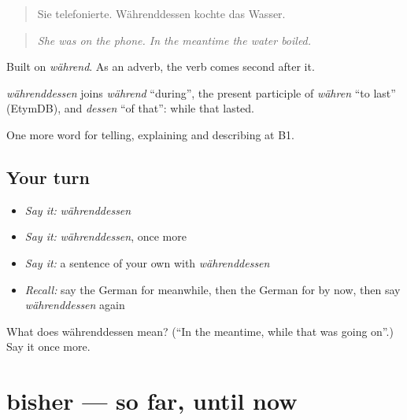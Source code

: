 \begin{quote}
Sie telefonierte. Währenddessen kochte das Wasser.
\end{quote}

\begin{quote}
\emph{She was on the phone. In the meantime the water boiled.}
\end{quote}

Built on \emph{während}. As an adverb, the verb comes second after it.

\begin{cousinweb}
\emph{währenddessen} joins \emph{während} \textquotedblleft{}during\textquotedblright{}, the present participle of \emph{währen} \textquotedblleft{}to last\textquotedblright{} (EtymDB), and \emph{dessen} \textquotedblleft{}of that\textquotedblright{}: while that lasted.
\end{cousinweb}

\begin{grammarlens}[title={What you've built}]
One more word for telling, explaining and describing at B1.
\end{grammarlens}

\subsection*{Your turn}
\begin{itemize}
\raggedright
  \item \emph{Say it:} \emph{währenddessen}
  \item \emph{Say it:} \emph{währenddessen}, once more
  \item \emph{Say it:} a sentence of your own with \emph{währenddessen}
  \item \emph{Recall:} say the German for meanwhile, then the German for by now, then say \emph{währenddessen} again
\end{itemize}

\begin{tcolorbox}[breakable,colback=teal!4,colframe=teal!35!black,title={Before you move on}]
What does währenddessen mean? (\textquotedblleft{}In the meantime, while that was going on\textquotedblright{}.) Say it once more.
\end{tcolorbox}
\section[bisher]{bisher — so far, until now}

\label{lesson:GE-C265-bisher}



